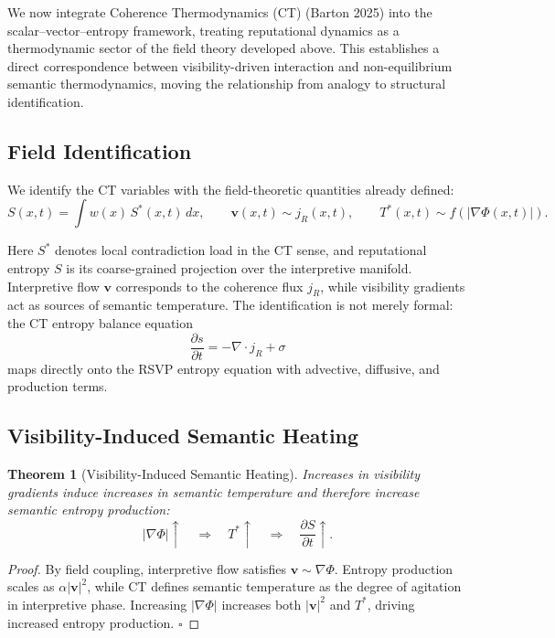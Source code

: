 \documentclass[12pt,a4paper]{article}
\newtheorem{theorem}{Theorem}
\begin{document}
We now integrate Coherence Thermodynamics (CT) (Barton 2025) into the scalar--vector--entropy framework, treating reputational dynamics as a thermodynamic sector of the field theory developed above. This establishes a direct correspondence between visibility-driven interaction and non-equilibrium semantic thermodynamics, moving the relationship from analogy to structural identification.

\subsection{Field Identification}

We identify the CT variables with the field-theoretic quantities already defined:
\[
S(x,t) = \int w(x)\, S^*(x,t)\,dx,
\qquad
\mathbf{v}(x,t) \sim j_R(x,t),
\qquad
T^*(x,t) \sim f(|\nabla \Phi(x,t)|).
\]

Here $S^*$ denotes local contradiction load in the CT sense, and reputational entropy $S$ is its coarse-grained projection over the interpretive manifold. Interpretive flow $\mathbf{v}$ corresponds to the coherence flux $j_R$, while visibility gradients act as sources of semantic temperature. The identification is not merely formal: the CT entropy balance equation
\[
\frac{\partial s}{\partial t} = -\nabla \cdot j_R + \sigma
\]
maps directly onto the RSVP entropy equation with advective, diffusive, and production terms.

\subsection{Visibility-Induced Semantic Heating}

\begin{theorem}[Visibility-Induced Semantic Heating]
Increases in visibility gradients induce increases in semantic temperature and therefore increase semantic entropy production:
\[
|\nabla \Phi| \uparrow \quad \Rightarrow \quad T^* \uparrow \quad \Rightarrow \quad \frac{\partial S}{\partial t} \uparrow.
\]
\end{theorem}

\begin{proof}
By field coupling, interpretive flow satisfies $\mathbf{v} \sim \nabla \Phi$. Entropy production scales as $\alpha|\mathbf{v}|^2$, while CT defines semantic temperature as the degree of agitation in interpretive phase. Increasing $|\nabla \Phi|$ increases both $|\mathbf{v}|^2$ and $T^*$, driving increased entropy production. \hfill$\square$
\end{proof}
\end{document}
